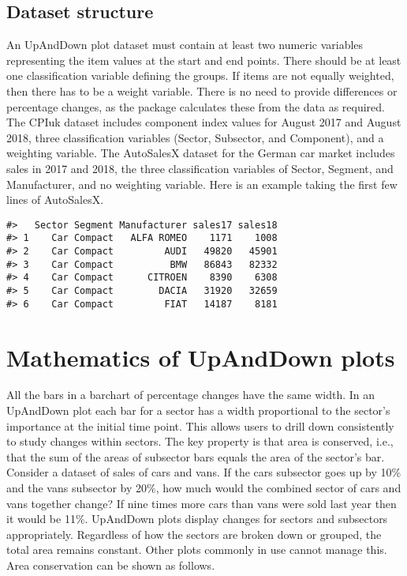 \hypertarget{dataset-structure}{%
\subsection{Dataset structure}\label{dataset-structure}}

An UpAndDown plot dataset must contain at least two numeric variables representing the item values at the start and end points. There should be at least one classification variable defining the groups. If items are not equally weighted, then there has to be a weight variable. There is no need to provide differences or percentage changes, as the package calculates these from the data as required. The CPIuk dataset includes component index values for August 2017 and August 2018, three classification variables (Sector, Subsector, and Component), and a weighting variable. The AutoSalesX dataset for the German car market includes sales in 2017 and 2018, the three classification variables of Sector, Segment, and Manufacturer, and no weighting variable. Here is an example taking the first few lines of AutoSalesX.

\begin{verbatim}
#>   Sector Segment Manufacturer sales17 sales18
#> 1    Car Compact   ALFA ROMEO    1171    1008
#> 2    Car Compact         AUDI   49820   45901
#> 3    Car Compact          BMW   86843   82332
#> 4    Car Compact      CITROEN    8390    6308
#> 5    Car Compact        DACIA   31920   32659
#> 6    Car Compact         FIAT   14187    8181
\end{verbatim}

\hypertarget{mathematics-of-upanddown-plots}{%
\section{Mathematics of UpAndDown plots}\label{mathematics-of-upanddown-plots}}

All the bars in a barchart of percentage changes have the same width. In an UpAndDown plot each bar for a sector has a width proportional to the sector's importance at the initial time point. This allows users to drill down consistently to study changes within sectors. The key property is that area is conserved, i.e., that the sum of the areas of subsector bars equals the area of the sector's bar. Consider a dataset of sales of cars and vans. If the cars subsector goes up by 10\% and the vans subsector by 20\%, how much would the combined sector of cars and vans together change? If nine times more cars than vans were sold last year then it would be 11\%. UpAndDown plots display changes for sectors and subsectors appropriately. Regardless of how the sectors are broken down or grouped, the total area remains constant. Other plots commonly in use cannot manage this. Area conservation can be shown as follows.

